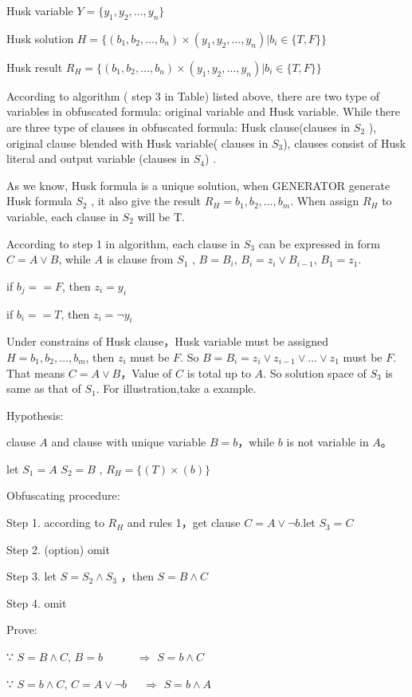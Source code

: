 \documentclass[runningheads,a4paper]{llncs}
\begin{document}
Husk variable  	        $Y=\{y_1,y_2,\dots,y_n \}$

Husk solution	        $H=\{(b_1,b_2,\dots,b_n)\times(y_1,y_2,\dots,y_n) | b_i∈ \{T,F\}\}$

Husk result	        $R_H=\{(b_1,b_2,\dots,b_n)\times(y_1,y_2,\dots,y_n)| b_i∈ \{T,F\}\}$

According to algorithm ( step 3 in Table) listed above, there are two type of variables in obfuscated formula: original variable and Husk variable. 
While there are three type of clauses in obfuscated formula: Husk clause(clauses in $S_2$ ),
original clause blended with Husk variable( clauses in $S_3$),
clauses consist of Husk literal and output variable (clauses in $S_4$) .

As we know, Husk formula is a unique solution, when GENERATOR generate Husk formula $S_2$ , it also give the result $R_H={b_1,b_2,\dots,b_m}$. When assign $R_H$ to variable, each clause in $S_2$ will be T.

According to step 1 in algorithm, each clause in $S_3$ can be expressed in form $C=A\vee B$, while $A$ is clause from $S_1$ , $B=B_i$, $B_i=z_i\vee B_{i-1}$, $B_1= z_1$.

if $b_j==F$, then $z_i =y_i$

if $b_i==T$, then $z_i = \neg y_i$

Under constrains of Husk clause，Husk variable must be assigned $H={b_1,b_2,\dots,b_m}$, then $z_i$ must be $F$. So $B=B_i=z_i\vee z_{i-1}\vee\dots\vee z_1$ must be $F$. 
That means $C=A\vee B$，Value of $C$ is total up to $A$. So solution space of $S_3$ is same as that of $S_1$. For illustration,take a example.

\noindent Hypothesis:

clause $A$ and clause with unique variable $B=b$，while $b$ is not variable in $A$。

let $S_1=A$  $S_2=B$ , $R_H=\{(T)\times(b)\}$

\noindent Obfuscating procedure:

Step 1. according to $R_H$ and rules 1，get clause $C=A\vee \neg b$.let $S_3=C$

Step 2. (option) omit

Step 3. let $S=S_2\wedge S_3$ ，then $S=B\wedge C$

Step 4. omit

\noindent Prove:

∵ $S=B\wedge C$, $B=b$ $~~~~~~~~~~~~\Longrightarrow$ $S=b\wedge C$   

∵ $S=b\wedge C$, $C=A\vee \neg b$ $~~~~~\Longrightarrow$ $S=b\wedge A$  
\end{document}
